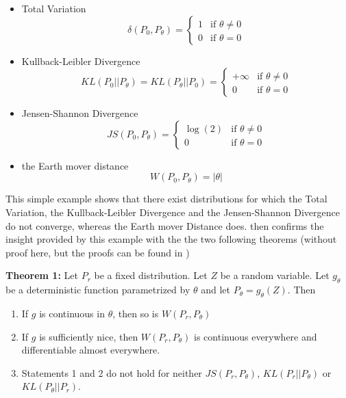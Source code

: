 \documentclass[11pt,a4paper,twoside]{report}
\begin{document}
\begin{itemize}
    \item Total Variation
    \begin{equation}
        \delta(P_0, P_{\theta}) = 
        \begin{cases}
            1 & \text{if } \theta \neq 0\\
            0 & \text{if } \theta = 0
        \end{cases}
    \end{equation}
    \item Kullback-Leibler Divergence
    \begin{equation}
        KL(P_0 || P_{\theta}) = KL(P_{\theta} || P_0) =
        \begin{cases}
            +\infty & \text{if } \theta \neq 0\\
            0 & \text{if } \theta = 0
        \end{cases}
    \end{equation}
    \item Jensen-Shannon Divergence  
    \begin{equation}
        JS(P_0, P_{\theta}) = 
        \begin{cases}
            \log(2) & \text{if } \theta \neq 0\\
            0 & \text{if } \theta = 0
        \end{cases}
    \end{equation}
    \item the Earth mover distance
    \begin{equation}
        W(P_0, P_{\theta}) = |\theta|
    \end{equation}
\end{itemize}

This simple example shows that there exist distributions for which the Total Variation, the Kullback-Leibler Divergence and the Jensen-Shannon Divergence do not converge, whereas the Earth mover Distance does. \cite{arjovsky2017wasserstein} then confirms the insight provided by this example with the the two following theorems (without proof here, but the proofs can be found in \cite{arjovsky2017wasserstein})

\textbf{Theorem 1:} Let $P_r$ be a fixed distribution. Let $Z$ be a random variable. Let $g_{\theta}$ be a deterministic function parametrized by $\theta$ and let $P_{\theta} = g_{\theta}(Z)$. Then

\begin{enumerate}
    \item If $g$ is continuous in $\theta$, then so is $W(P_r, P_{\theta})$
    \item If $g$ is sufficiently nice, then $W(P_r, P_{\theta})$ is continuous everywhere and differentiable almost everywhere.
    \item Statements 1 and 2 do not hold for neither $JS(P_r, P_{\theta})$, $KL(P_r||P_{\theta})$ or $KL(P_{\theta}||P_r)$.
\end{enumerate}
\end{document}
